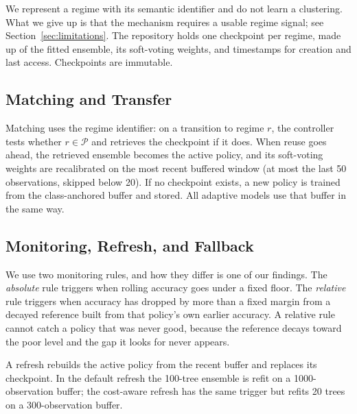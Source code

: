 \documentclass[conference]{IEEEtran}
\begin{document}
We represent a regime with its semantic identifier and do not learn a clustering.  What we give up is that
the mechanism requires a usable regime signal; see Section~\ref{sec:limitations}. The
repository holds one checkpoint per regime, made up of the fitted ensemble, its
soft-voting weights, and timestamps for creation and last access. Checkpoints are
immutable.


\subsection{Matching and Transfer}
Matching uses the regime identifier: on a transition to regime $r$, the controller tests
whether $r \in \mathcal{P}$ and retrieves the checkpoint if it does. When reuse goes
ahead, the retrieved ensemble becomes the active policy, and its soft-voting weights are
recalibrated on the most recent buffered window (at most the last 50 observations, skipped
below 20). If no checkpoint exists, a new policy is trained from the class-anchored buffer
and stored. All adaptive models use that buffer in the same way.


\subsection{Monitoring, Refresh, and Fallback}
We use two monitoring rules, and how they differ is one of our findings. The
\emph{absolute} rule triggers when rolling accuracy goes under a fixed floor. The
\emph{relative} rule triggers when accuracy has dropped by more than a fixed margin from
a decayed reference built from that policy's own earlier accuracy. A relative rule cannot
catch a policy that was never good, because the reference decays toward the poor level and
the gap it looks for never appears.

A refresh rebuilds the active policy from the recent buffer and replaces its checkpoint.
In the default refresh the 100-tree ensemble is refit on a 1000-observation buffer; the
cost-aware refresh has the same trigger but refits 20 trees on a 300-observation buffer.
\end{document}
